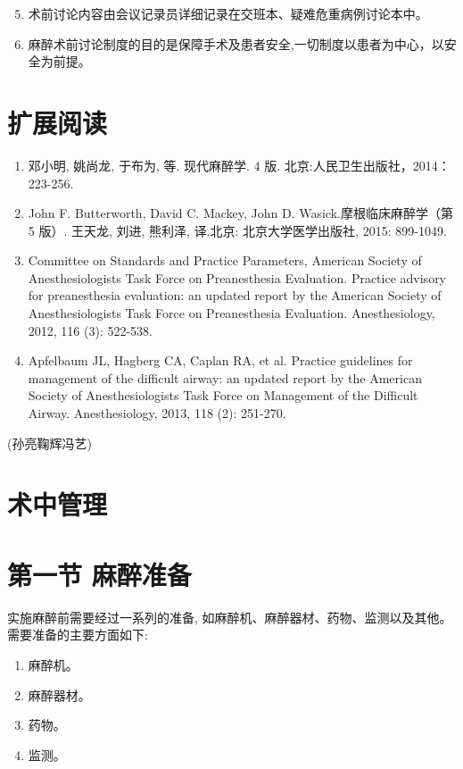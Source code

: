 \documentclass[10pt]{article}
\begin{document}
\begin{enumerate}
  \setcounter{enumi}{4}
  \item 术前讨论内容由会议记录员详细记录在交班本、疑难危重病例讨论本中。

  \item 麻醉术前讨论制度的目的是保障手术及患者安全,一切制度以患者为中心，以安全为前提。

\end{enumerate}

\section*{扩展阅读}
\begin{enumerate}
  \item 邓小明, 姚尚龙, 于布为, 等. 现代麻醉学. 4 版. 北京:人民卫生出版社，2014：223-256.

  \item John F. Butterworth, David C. Mackey, John D. Wasick.摩根临床麻醉学（第 5 版）. 王天龙, 刘进, 熊利泽, 译.北京: 北京大学医学出版社, 2015: 899-1049.

  \item Committee on Standards and Practice Parameters, American Society of Anesthesiologists Task Force on Preanesthesia Evaluation. Practice advisory for preanesthesia evaluation: an updated report by the American Society of Anesthesiologists Task Force on Preanesthesia Evaluation. Anesthesiology, 2012, 116 (3): 522-538.

  \item Apfelbaum JL, Hagberg CA, Caplan RA, et al. Practice guidelines for management of the difficult airway: an updated report by the American Society of Anesthesiologists Task Force on Management of the Difficult Airway. Anesthesiology, 2013, 118 (2): 251-270.

\end{enumerate}

(孙亮鞠辉冯艺)

\section*{术中管理}
\section*{第一节 麻醉准备}
实施麻醉前需要经过一系列的准备, 如麻醉机、麻醉器材、药物、监测以及其他。需要准备的主要方面如下:

\begin{enumerate}
  \item 麻醉机。

  \item 麻醉器材。

  \item 药物。

  \item 监测。

\end{enumerate}
\end{document}
